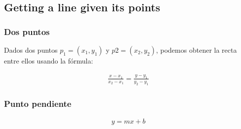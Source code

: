\subsection{Getting a line given its points}

\subsubsection{Dos puntos}

Dados dos puntos \( p_1 = (x_1, y_1) \) y \( p2 = (x_2, y_2) \), podemos obtener la recta entre ellos usando la fórmula:

\begin{align*}
    \frac{x-x_1}{x_2 - x_1} = \frac{y-y_1}{y_2 - y_1}
\end{align*}

\subsubsection{Punto pendiente}

\begin{align}
    y = mx + b \nonumber
\end{align}